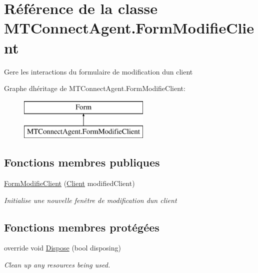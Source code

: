 \hypertarget{class_m_t_connect_agent_1_1_form_modifie_client}{}\section{Référence de la classe M\+T\+Connect\+Agent.\+Form\+Modifie\+Client}
\label{class_m_t_connect_agent_1_1_form_modifie_client}


Gere les interactions du formulaire de modification d\textquotesingle{}un client  


Graphe d\textquotesingle{}héritage de M\+T\+Connect\+Agent.\+Form\+Modifie\+Client\+:\begin{figure}[H]
\begin{center}
\leavevmode
\includegraphics[height=2.000000cm]{class_m_t_connect_agent_1_1_form_modifie_client}
\end{center}
\end{figure}
\subsection*{Fonctions membres publiques}
\begin{DoxyCompactItemize}
\item 
\mbox{\hyperlink{class_m_t_connect_agent_1_1_form_modifie_client_abf3cd828422fd500ceb400a5510f6bc2}{Form\+Modifie\+Client}} (\mbox{\hyperlink{class_m_t_connect_agent_1_1_model_1_1_client}{Client}} modified\+Client)
\begin{DoxyCompactList}\small\item\em Initialise une nouvelle fenêtre de modification d\textquotesingle{}un client \end{DoxyCompactList}\end{DoxyCompactItemize}
\subsection*{Fonctions membres protégées}
\begin{DoxyCompactItemize}
\item 
override void \mbox{\hyperlink{class_m_t_connect_agent_1_1_form_modifie_client_aa6bee7fe870c277672868b2672841149}{Dispose}} (bool disposing)
\begin{DoxyCompactList}\small\item\em Clean up any resources being used. \end{DoxyCompactList}\end{DoxyCompactItemize}
